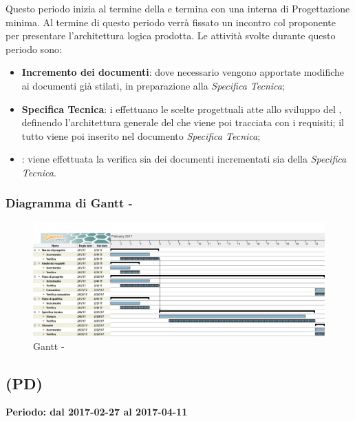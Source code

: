 \documentclass[./PianoDiProgetto.tex]{subfiles}
\begin{document}
\begin{itemize}
  Questo periodo inizia al termine della \PerAD{} e termina con una  interna di \label{Revisione} Progettazione minima. Al termine di questo periodo verrà fissato un incontro col proponente per presentare l'architettura logica prodotta. Le attività svolte durante questo periodo sono:
  \begin{itemize}
    \item \textbf{Incremento dei documenti}: dove necessario vengono apportate modifiche ai documenti già stilati, in preparazione alla  \textit{Specifica Tecnica};
    \item \textbf{Specifica Tecnica}: i \PJP{} effettuano le scelte progettuali atte allo sviluppo del , definendo l'architettura generale del  che viene poi tracciata con i requisiti; il  tutto viene poi inserito nel documento \textit{Specifica Tecnica};
    \item \textbf{}: viene effettuata la verifica sia dei documenti incrementati sia della \textit{Specifica Tecnica}.
  \end{itemize}

  \end{itemize}
\clearpage
  \subsubsection{Diagramma di Gantt - \PerPA}
    \begin{figure}[!h]
    \centering
    \includegraphics[width=\textwidth]{images/PA}
    \caption{Gantt - \PerPA}
    \end{figure}

  \subsection{\PerPD{} (PD)}
  \textbf{Periodo: dal 2017-02-27 al 2017-04-11}
\end{document}
